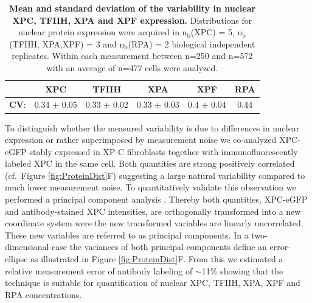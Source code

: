 \begin{table}[h!]
	\centering
	\begin{tabular}{cccccc}
		\hline
		\rule{0pt}{2ex}
		&\textbf{XPC} & \textbf{TFIIH} & \textbf{XPA} & \textbf{XPF} & \textbf{RPA}\\ \hline
		\rule{0pt}{3ex}
		\textbf{CV}: & 0.34 $\pm$ 0.05 & 0.33 $\pm$ 0.02 & 0.33 $\pm$ 0.03 & 0.4 $\pm$ 0.04 & 0.44\\ \hline
		
	\end{tabular}
	\caption{\textbf{Mean and standard deviation of the variability in nuclear XPC, TFIIH, XPA and XPF expression.} Distributions for nuclear protein expression were acquired in $\text{n}_\text{b}$(XPC) = 5, $\text{n}_\text{b}$(TFIIH, XPA,XPF) = 3 and $\text{n}_\text{b}$(RPA) = 2 biological independent replicates. Within each measurement between n=250 and n=572 with an average of n=477 cells were analyzed.}\label{tab:proteinVariability}
\end{table}      

To distinguish whether the measured variability is due to differences in nuclear expression or rather superimposed by measurement noise we co-analyzed XPC-eGFP stably expressed in XP-C fibroblasts together with immunofluorescently labeled XPC in the same cell. Both quantities are strong positively correlated (cf.\ Figure \ref{fig:ProteinDist}F) suggesting a large natural variability compared to much lower measurement noise. To quantitatively validate this observation we performed a principal component analysis \cite{Pearson1901}. Thereby both quantities, XPC-eGFP and antibody-stained XPC intensities, are orthogonally transformed into a new coordinate system were the new transformed variables are linearly uncorrelated. These new variables are referred to as principal components. In a two-dimensional case the variances of both principal components define an error-ellipse as illustrated in Figure \ref{fig:ProteinDist}F. From this we estimated a relative measurement error of antibody labeling of $\sim$11\% showing that the technique is suitable for quantification of nuclear XPC, TFIIH, XPA, XPF and RPA concentrations.       

